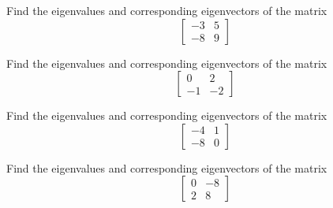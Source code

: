 \begin{exercise}\ansMark%
Find the eigenvalues and corresponding eigenvectors of the matrix 
\[ \begin{bmatrix} -3 & 5 \\ -8 & 9 \end{bmatrix} \]
\end{exercise}

\begin{exercise}\ansMark%
Find the eigenvalues and corresponding eigenvectors of the matrix 
\[ \begin{bmatrix} 0 & 2 \\ -1 & -2 \end{bmatrix} \]
\end{exercise}

\begin{exercise}\ansMark%
Find the eigenvalues and corresponding eigenvectors of the matrix 
\[ \begin{bmatrix} -4 & 1 \\ -8 & 0 \end{bmatrix} \]
\end{exercise}

\begin{exercise}\ansMark%
Find the eigenvalues and corresponding eigenvectors of the matrix 
\[ \begin{bmatrix} 0 & -8 \\ 2 & 8 \end{bmatrix} \]
\end{exercise}

